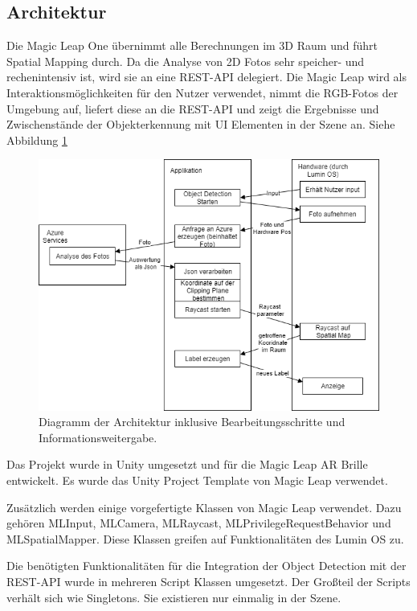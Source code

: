 \subsection{Architektur}

Die Magic Leap One übernimmt alle Berechnungen im 3D Raum und führt Spatial Mapping durch. Da die Analyse von 2D Fotos sehr speicher- und rechenintensiv ist, wird sie an eine REST-API delegiert. Die Magic Leap wird als Interaktionsmöglichkeiten für den Nutzer verwendet, nimmt die RGB-Fotos der Umgebung auf, liefert diese an die REST-API und zeigt die Ergebnisse und Zwischenstände der Objekterkennung mit UI Elementen in der Szene an. Siehe Abbildung \ref{dia:flow}

\begin{figure}[H]
	\centering
	\includegraphics[width=1\textwidth]{images/dia_flow.png}
	\caption[Diagramm der Architektur]{Diagramm der Architektur inklusive Bearbeitungsschritte und Informationsweitergabe.}
	\label{dia:flow}
\end{figure}

Das Projekt wurde in Unity umgesetzt und für die Magic Leap AR Brille entwickelt.
Es wurde das Unity Project Template von Magic Leap verwendet. 

Zusätzlich werden einige vorgefertigte Klassen von Magic Leap verwendet. Dazu gehören MLInput, MLCamera, MLRaycast, MLPrivilegeRequestBehavior und MLSpatialMapper. Diese Klassen greifen auf Funktionalitäten des Lumin OS zu.

Die benötigten Funktionalitäten für die Integration der Object Detection mit der REST-API wurde in mehreren Script Klassen umgesetzt. Der Großteil der Scripts verhält sich wie Singletons. Sie existieren nur einmalig in der Szene.

